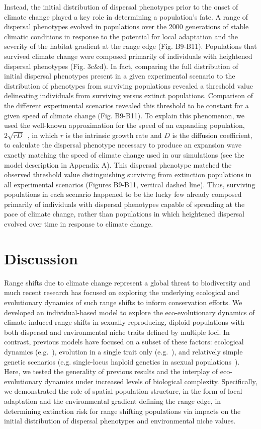 \documentclass[12pt, oneside]{article}
\begin{document}
Instead, the initial distribution of dispersal phenotypes prior to the onset of climate change played a key role in determining a population's fate. A range of dispersal phenotypes evolved in populations over the $2000$ generations of stable climatic conditions in response to the potential for local adaptation and the severity of the habitat gradient at the range edge (Fig. B9-B11). Populations that survived climate change were composed primarily of individuals with heightened dispersal phenotypes (Fig. 3c\&d). In fact, comparing the full distribution of initial dispersal phenotypes present in a given experimental scenario to the distribution of phenotypes from surviving populations revealed a threshold value delineating individuals from surviving versus extinct populations. Comparison of the different experimental scenarios revealed this threshold to be constant for a given speed of climate change (Fig. B9-B11). To explain this phenomenon, we used the well-known approximation for the speed of an expanding population, $2\sqrt{rD}$~\citep{hastings2005spatial}, in which $r$ is the intrinsic growth rate and $D$ is the diffusion coefficient, to calculate the dispersal phenotype necessary to produce an expansion wave exactly matching the speed of climate change used in our simulations (see the model description in Appendix A). This dispersal phenotype matched the observed threshold value distinguishing surviving from extinction populations in all experimental scenarios (Figures B9-B11, vertical dashed line). Thus, surviving populations in each scenario happened to be the lucky few already composed primarily of individuals with dispersal phenotypes capable of spreading at the pace of climate change, rather than populations in which heightened dispersal evolved over time in response to climate change.

\section*{Discussion}
Range shifts due to climate change represent a global threat to biodiversity and much recent research has focused on exploring the underlying ecological and evolutionary dynamics of such range shifts to inform conservation efforts. We developed an individual-based model to explore the eco-evolutionary dynamics of climate-induced range shifts in sexually reproducing, diploid populations with both dispersal and environmental niche traits defined by multiple loci. In contrast, previous models have focused on a subset of these factors: ecological dynamics (e.g.~\citep{brooker2007modelling}), evolution in a single trait only (e.g.~\citep{atkins2010local, henry2013eco}), and relatively simple genetic scenarios (e.g. single-locus haploid genetics in asexual populations~\citep{boeye2013more, hargreaves2015fitness}).  Here, we tested the generality of previous results and the interplay of eco-evolutionary dynamics under increased levels of biological complexity. Specifically, we demonstrated the role of spatial population structure, in the form of local adaptation and the environmental gradient defining the range edge, in determining extinction risk for range shifting populations via impacts on the initial distribution of dispersal phenotypes and environmental niche values.
\end{document}
